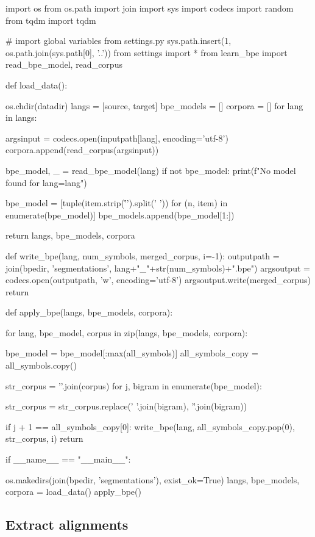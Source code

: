 \begin{python}
import os
from os.path import join
import sys
import codecs
import random
from tqdm import tqdm

# import global variables from settings.py
sys.path.insert(1, os.path.join(sys.path[0], '..'))
from settings import *
from learn_bpe import read_bpe_model, read_corpus

def load_data():

  os.chdir(datadir)
  langs = [source, target]
  bpe_models = []
  corpora = []
  for lang in langs:

    argsinput = codecs.open(inputpath[lang], encoding='utf-8')
    corpora.append(read_corpus(argsinput))

    bpe_model, _ = read_bpe_model(lang)
    if not bpe_model:
      print(f"No model found for lang={lang}")

    bpe_model = [tuple(item.strip('\r\n ').split(' ')) for (n, item) in enumerate(bpe_model)]
    bpe_models.append(bpe_model[1:])

  return langs, bpe_models, corpora

def write_bpe(lang, num_symbols, merged_corpus, i=-1):
  outputpath = join(bpedir, 'segmentations', lang+"_"+str(num_symbols)+".bpe")
  argsoutput = codecs.open(outputpath, 'w', encoding='utf-8')
  argsoutput.write(merged_corpus)
  return

def apply_bpe(langs, bpe_models, corpora):
    
  for lang, bpe_model, corpus in zip(langs, bpe_models, corpora):

    bpe_model = bpe_model[:max(all_symbols)]
    all_symbols_copy = all_symbols.copy()

    str_corpus = '\n'.join(corpus)
    for j, bigram in enumerate(bpe_model):

      str_corpus = str_corpus.replace(' '.join(bigram), ''.join(bigram))

      if j + 1 == all_symbols_copy[0]:
        write_bpe(lang, all_symbols_copy.pop(0), str_corpus, i)
  return

if __name__ == "__main__":

  os.makedirs(join(bpedir, 'segmentations'), exist_ok=True)
  langs, bpe_models, corpora = load_data()
  apply_bpe()
\end{python}

\subsection{Extract alignments}

